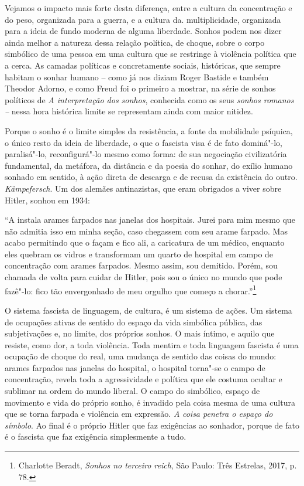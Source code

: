 Vejamos o impacto mais forte desta diferença, entre a cultura da
concentração e do peso, organizada para a guerra, e a cultura da.
multiplicidade, organizada para a ideia de fundo moderna de alguma
liberdade. Sonhos podem nos dizer ainda melhor a natureza dessa relação
política, de choque, sobre o corpo simbólico de uma pessoa em uma
cultura que se restringe à violência política que a cerca. As camadas
políticas e concretamente sociais, históricas, que sempre habitam o
sonhar humano -- como já nos diziam Roger Bastide e também Theodor
Adorno, e como Freud foi o primeiro a mostrar, na série de sonhos
políticos de \emph{A interpretação dos sonhos}, conhecida como os seus
\emph{sonhos romanos --} nessa hora histórica limite se representam
ainda com maior nitidez.

Porque o sonho é o limite simples da resistência, a fonte da mobilidade
psíquica, o único resto da ideia de liberdade, o que o fascista visa é
de fato dominá"-lo, paralisá"-lo, reconfigurá"-lo mesmo como forma: de sua
negociação civilizatória fundamental, da metáfora, da distância e da
poesia do sonhar, do exílio humano sonhado em sentido, à ação direta de
descarga e de recusa da existência do outro. \emph{Kämpefersch}. Um dos
alemães antinazistas, que eram obrigados a viver sobre Hitler, sonhou em
1934:

``A  instala arames farpados nas janelas dos hospitais. Jurei para mim
mesmo que não admitia isso em minha seção, caso chegassem com seu arame
farpado. Mas acabo permitindo que o façam e fico ali, a caricatura de um
médico, enquanto eles quebram os vidros e transformam um quarto de
hospital em campo de concentração com arames farpados. Mesmo assim, sou
demitido. Porém, sou chamada de volta para cuidar de Hitler, pois sou o
único no mundo que pode fazê"-lo: fico tão envergonhado de meu orgulho
que começo a chorar.''\footnote{Charlotte Beradt, \emph{Sonhos no
  terceiro reich}, São Paulo: Três Estrelas, 2017, p. 78.}

O sistema fascista de linguagem, de cultura, é um sistema de ações. Um
sistema de ocupações ativas de sentido do espaço da vida simbólica
pública, das subjetivações e, no limite, dos próprios sonhos. O mais
íntimo, e aquilo que resiste, como dor, a toda violência. Toda mentira e
toda linguagem fascista é uma ocupação de choque do real, uma mudança de
sentido das coisas do mundo: arames farpados nas janelas do hospital, o
hospital torna"-se o campo de concentração, revela toda a agressividade e
política que ele costuma ocultar e sublimar na ordem do mundo liberal. O
campo do simbólico, espaço de movimento e vida do próprio sonho, é
invadido pela coisa mesma de uma cultura que se torna farpada e
violência em expressão. \emph{A} \emph{coisa penetra o espaço do
símbolo}. Ao final é o próprio Hitler que faz exigências ao sonhador,
porque de fato é o fascista que faz exigência simplesmente a tudo.

